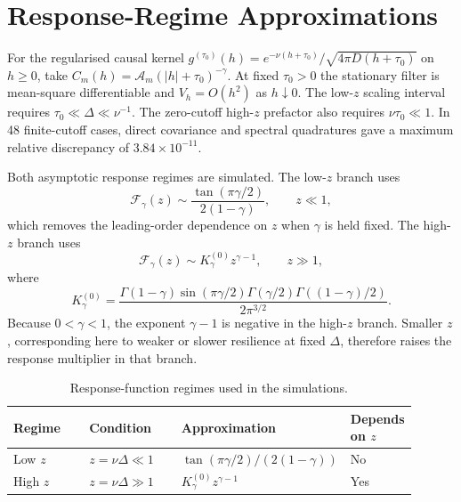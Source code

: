 \documentclass[11pt]{article}
\newcommand{\Fresp}{\mathcal F}
\begin{document}
\section{Response-Regime Approximations}

For the regularised causal kernel
\(g^{(\tau_0)}(h)=e^{-\nu(h+\tau_0)}/\sqrt{4\pi D(h+\tau_0)}\)
on \(h\ge0\), take \(C_m(h)=\mathcal A_m(|h|+\tau_0)^{-\gamma}\).
At fixed \(\tau_0>0\) the stationary filter is mean-square differentiable
and \(V_h=O(h^2)\) as \(h\downarrow0\). The low-\(z\) scaling interval
requires \(\tau_0\ll\Delta\ll\nu^{-1}\). The zero-cutoff high-\(z\)
prefactor also requires \(\nu\tau_0\ll1\). In 48 finite-cutoff cases,
direct covariance and spectral quadratures gave a maximum relative
discrepancy of \(3.84\times10^{-11}\).

Both asymptotic response regimes are simulated. The low-\(z\) branch uses
\begin{equation}
 \Fresp_\gamma(z)
 \sim
 \frac{\tan(\pi\gamma/2)}{2(1-\gamma)},
 \qquad z\ll1,
 \label{eq:low-z-response}
\end{equation}
which removes the leading-order dependence on \(z\) when \(\gamma\) is held
fixed. The high-\(z\) branch uses
\begin{equation}
 \Fresp_\gamma(z)
 \sim
 K_\gamma^{(0)}z^{\gamma-1},
 \qquad z\gg1,
 \label{eq:high-z-response}
\end{equation}
where
\begin{equation}
 K_\gamma^{(0)}
 =
 \frac{
 \Gamma(1-\gamma)\sin(\pi\gamma/2)
 \Gamma(\gamma/2)\Gamma((1-\gamma)/2)
 }{2\pi^{3/2}}.
 \label{eq:k-gamma}
\end{equation}
Because \(0<\gamma<1\), the exponent \(\gamma-1\) is negative in the
high-\(z\) branch. Smaller \(z\), corresponding here to weaker or slower
resilience at fixed \(\Delta\), therefore raises the response multiplier in
that branch.

\begin{table}[ht]
\centering
\small
\caption{Response-function regimes used in the simulations.}
\label{tab:response-regimes}
\begin{tabular}{p{0.19\linewidth}p{0.23\linewidth}p{0.37\linewidth}p{0.11\linewidth}}
\toprule
Regime & Condition & Approximation & Depends on \(z\) \\
\midrule
Low \(z\) & \(z=\nu\Delta\ll1\) &
\(\tan(\pi\gamma/2)/(2(1-\gamma))\) & No \\
High \(z\) & \(z=\nu\Delta\gg1\) &
\(K_\gamma^{(0)}z^{\gamma-1}\) & Yes \\
\bottomrule
\end{tabular}
\end{table}
\end{document}
